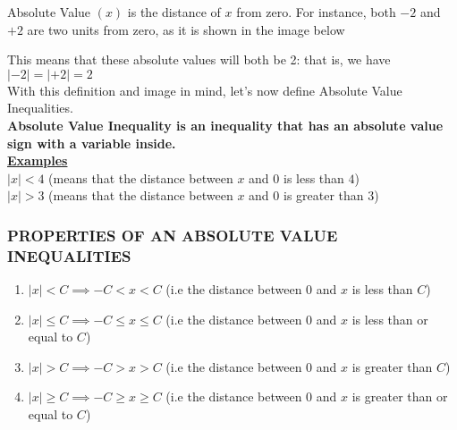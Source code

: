 \documentclass[12pt]{report}
\newcommand{\bt}[1]{\textbf{#1}}
\newcommand{\ubt}[1]{\textbf{\underline{#1}}}
\newcommand{\spn}[1]{\\[#1cm]}
\newcommand{\NI}{\noindent}
\begin{document}
	\NI Absolute Value $(x)$ is the distance of $x$ from zero. For instance, both $-2$ and $+2$ are two units from zero, as it is shown in the image below\\
		
	\begin{center}
	\end{center}
		
	\NI This means that these absolute values will both be 2: that is, we have $|-2| = |+2| = 2$\\
	
	\NI With this definition and image in mind, let's now define Absolute Value Inequalities.\spn{-.5}
		
	\NI\bt{Absolute Value Inequality is an inequality that has an absolute value sign with a variable inside.}\spn{-.4}
		
	\NI\ubt{Examples}\\
	$|x| < 4$ (means that the distance between $x$ and $0$ is less than $4$)\\
	$|x| > 3$ (means that the distance between $x$ and $0$ is greater than $3$)\\
		
	\subsubsection{PROPERTIES OF AN ABSOLUTE VALUE INEQUALITIES}
	\begin{enumerate}
		\item $|x| < C \implies -C < x < C$ (i.e the distance between $0$ and $x$ is less than $C$)
			
		\item $|x| \leq C \implies -C \leq x \leq C$ (i.e the distance between $0$ and $x$ is less than or equal to $C$)
			
		\item $|x| > C \implies -C > x > C$ (i.e the distance between $0$ and $x$ is greater than $C$)
			
		\item $|x| \geq C \implies -C \geq x \geq C$ (i.e the distance between $0$ and $x$ is greater than or equal to $C$)
	\end{enumerate}
	
\end{document}
